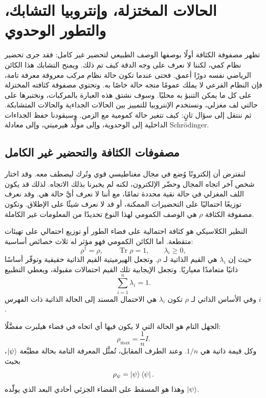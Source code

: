 \chapter{الحالات المختزلة، وإنتروبيا التشابك، والتطور الوحدوي}

تظهر مصفوفة الكثافة أولًا بوصفها الوصف الطبيعي لتحضير غير كامل: فقد جرى تحضير نظام كمي، لكننا لا نعرف على وجه الدقة كيف تم ذلك. ويمنح التشابك هذا الكائن الرياضي نفسه دورًا أعمق. فحتى عندما تكون حالة نظام مركب معروفة معرفة تامة، فإن النظام الفرعي لا يملك عمومًا متجه حالة خاصًا به. وتحتوي مصفوفة كثافته المختزلة على كل ما يمكن التنبؤ به محليًا. وسوف نشتق هذه العبارة بالمركبات، ونختبرها على حالتي لف مغزلي، ونستخدم الإنتروبيا للتمييز بين الحالات الجداءية والحالات المتشابكة. ثم ننتقل إلى سؤال ثانٍ: كيف تتغير حالة كمومية مع الزمن. وسيقودنا حفظ الجداءات الداخلية إلى الوحدوية، وإلى مولِّد هيرميتي، وإلى معادلة Schr\"odinger.

\section{مصفوفات الكثافة والتحضير غير الكامل}

لنفترض أن إلكترونًا وُضع في مجال مغناطيسي قوي وتُرك ليصطف معه. وقد اختار شخص آخر اتجاه المجال وحضّر الإلكترون، لكنه لم يخبرنا بذلك الاتجاه. لذلك قد يكون اللف المغزلي في حالة نقية محددة تمامًا، مع أننا لا نعرف أيَّ حالة هي. وقد نعرف توزيعًا احتماليًا على التحضيرات الممكنة، أو قد لا نعرف شيئًا على الإطلاق. وتكون مصفوفة الكثافة \(\rho\) هي الوصف الكمومي لهذا النوع تحديدًا من المعلومات غير الكاملة.

النظير الكلاسيكي هو كثافة احتمالية على فضاء الطور أو توزيع احتمالي على تهيئات متقطعة. أما الكائن الكمومي فهو مؤثر له ثلاث خصائص أساسية:
\begin{equation}
\rho^\dagger=\rho,
\qquad
\operatorname{Tr}\rho=1,
\qquad
\lambda_i\geq 0,
\end{equation}
حيث إن \(\lambda_i\) هي القيم الذاتية لـ \(\rho\). وتجعل الهيرميتية القيم الذاتية حقيقية وتوفّر أساسًا ذاتيًا متعامدًا معياريًا. وتجعل الإيجابية تلك القيم احتمالات مقبولة، ويعطي التطبيع
\begin{equation}
\sum_{i=1}^{n}\lambda_i=1.
\end{equation}
وفي الأساس الذاتي لـ \(\rho\) تكون \(\lambda_i\) هي الاحتمال المسند إلى الحالة الذاتية ذات الفهرس \(i\).

الجهل التام هو الحالة التي لا يكون فيها أي اتجاه في فضاء هيلبرت مفضَّلًا:
\begin{equation}
\rho_{\mathrm{max}}=\frac{1}{n}I.
\end{equation}
وكل قيمة ذاتية هي \(1/n\). وعند الطرف المقابل، تُمثَّل المعرفة التامة بحالة مطبَّعة \(\left\lvert\psi\right\rangle\)، بحيث
\begin{equation}
\rho_\psi=\left\lvert\psi\right\rangle\left\langle\psi\right\rvert.
\end{equation}
وهذا هو المسقط على الفضاء الجزئي أحادي البعد الذي يولّده \(\left\lvert\psi\right\rangle\).

